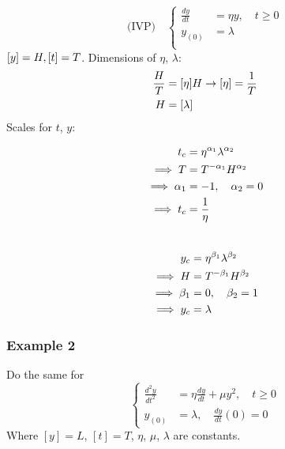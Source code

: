\documentclass[12pt]{article}
\begin{document}
\begin{equation} \text{(IVP)}\quad
  \left\{
  \begin{aligned}
    \frac{dy}{dt} &= \eta y, \quad t\ge0 \\
    y_{(0)} &= \lambda \\
  \end{aligned} \right.
\end{equation}
$[y] = H , [t]=T$. Dimensions of $\eta$, $\lambda$:
\begin{equation}
  \begin{aligned}
    \frac{H}{T} &= [\eta]H \rightarrow [\eta]=\frac{1}{T} \\
    H &= [\lambda]
  \end{aligned}
\end{equation}
Scales for $t$, $y$:
\begin{multicols}{2}
  \begin{equation}
    \begin{aligned}
      t_c &= \eta^{\alpha_1} \lambda^{\alpha_2} \\
      \implies T &= T^{-\alpha_1}H^{\alpha_2} \\
      \implies \alpha_1 &= -1,\quad \alpha_2 = 0 \\
      \implies t_c &= \frac{1}{\eta}\\
    \end{aligned}
  \end{equation}
\\
  \begin{equation}
    \begin{aligned}
      y_c &= \eta^{\beta_1} \lambda^{\beta_2} \\
      \implies H &= T^{-\beta_1}H^{\beta_2} \\
      \implies \beta_1 &= 0,\quad \beta_2 = 1 \\
      \implies y_c &= \lambda
    \end{aligned}
  \end{equation}
\end{multicols}
\subsubsection{Example 2}

Do the same for
\begin{equation}
  \left\{
  \begin{aligned}
    \frac{d^2y}{dt^2} &= \eta \frac{dy}{dt} + \mu y^2,\quad t \ge 0 \\
    y_{(0)} &= \lambda, \quad \frac{dy}{dt}(0) = 0
  \end{aligned} \right.
\end{equation}
Where $[y]=L$, $[t]=T$, $\eta$, $\mu$, $\lambda$ are constants.
\end{document}
